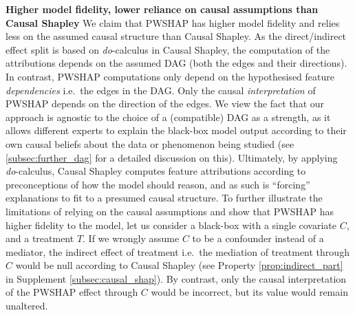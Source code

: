 \documentclass{article}
\theoremstyle{plain}
\theoremstyle{definition}
\theoremstyle{remark}
\theoremstyle{mystyle}
\begin{document}
\textbf{Higher model fidelity, lower reliance on causal assumptions than Causal Shapley} We claim that PWSHAP has higher model fidelity and relies less on the assumed causal structure than Causal Shapley. As the direct/indirect effect split is based on \textit{do}-calculus in Causal Shapley, the computation of the attributions depends on the assumed DAG (both the edges and their directions). In contrast, PWSHAP computations only depend on the hypothesised feature \emph{dependencies} i.e.\ the edges in the DAG. Only the causal \emph{interpretation} of PWSHAP depends on the direction of the edges. We view the fact that our approach is agnostic to the choice of a (compatible) DAG as a strength, as it allows different experts to explain the black-box model output according to their own causal beliefs about the data or phenomenon being studied (see \ref{subsec:further_dag} for a detailed discussion on this). Ultimately, by applying \textit{do}-calculus, Causal Shapley computes feature attributions according to preconceptions of how the model should reason, and as such is “forcing” explanations to fit to a presumed causal structure. 
To further illustrate the limitations of relying on the causal assumptions and show that PWSHAP has higher fidelity to the model, let us consider a black-box with a single covariate $C$, and a treatment $T$. If we wrongly assume $C$ to be a confounder instead of a mediator, the indirect effect of treatment i.e.\ the mediation of treatment through $C$ would be null according to Causal Shapley (see Property \ref{prop:indirect_part} in Supplement \ref{subsec:causal_shap}). By contrast, only the causal interpretation of the PWSHAP effect through $C$ would be incorrect, but its value would remain unaltered. 
\end{document}
